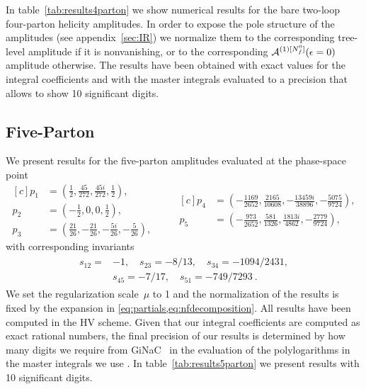 In table~\ref{tab:results4parton} we show numerical results for
the bare two-loop four-parton helicity amplitudes.
In order to expose the pole structure of the amplitudes (see
appendix~\ref{sec:IR}) we normalize them to
the corresponding tree-level amplitude if
it is nonvanishing, or to the corresponding $\mathcal{A}^{(1)[N_f^0]}(\epsilon=0)$ amplitude otherwise.
The results have been obtained with exact values for the 
integral coefficients and with the master integrals 
evaluated to a precision that allows to show 10
significant digits.




\subsection{Five-Parton}
\label{sec:fivepartonRes}
We present results for the five-parton amplitudes evaluated at
the phase-space point
\begin{equation}
  \begin{aligned}[c]
    p_1 &= \left( \frac{1}{2}, \frac{45}{272}, \frac{45 i}{272}, \frac{1}{2} \right), \\
    p_2 &= \left( -\frac{1}{2}, 0, 0, \frac{1}{2} \right), \\
    p_3 &= \left( \frac{21}{26}, -\frac{21}{26}, -\frac{5 i}{26}, -\frac{5}{26} \right),
  \end{aligned}
  \qquad
  \begin{aligned}[c]
    p_4 &= \left( -\frac{1169}{2652}, \frac{2165}{10608}, -\frac{13459 i}{38896}, -\frac{5075}{9724} \right),\\[3ex]
    p_5 &= \left( -\frac{973}{2652}, \frac{581}{1326}, \frac{1813 i}{4862}, -\frac{2779}{9724} \right),
  \end{aligned}
  \label{eq:EvalPoint5}
\end{equation}
with corresponding invariants
\begin{align}
  \label{eq:Invs5pt}
  \begin{split}
    s_{12} =& -1, \quad s_{23} = -8/13, \quad s_{34} = -1094/2431,\\
    &s_{45} = -7/17, \quad s_{51} = -749/7293\ .
  \end{split}
\end{align}
We set the regularization scale~$\mu$ to 1 and the normalization
of the results is fixed by the expansion in 
\cref{eq:partials,eq:nfdecomposition}. All results have been computed in the 
HV scheme. Given that our integral coefficients are computed as 
exact rational numbers, the final precision of our results is 
determined by how many digits we require from 
GiNaC~\cite{Vollinga:2004sn}
in the evaluation of the polylogarithms in the master integrals
we use \cite{Papadopoulos:2015jft,Gehrmann:2000zt}. In
table~\ref{tab:results5parton} we present results with 10
significant digits.

